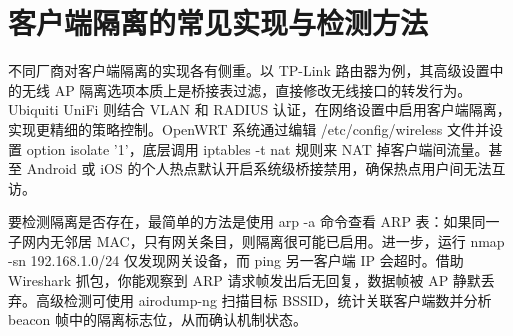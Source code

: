 \chapter{客户端隔离的常见实现与检测方法}
不同厂商对客户端隔离的实现各有侧重。以 TP-Link 路由器为例，其高级设置中的无线 AP 隔离选项本质上是桥接表过滤，直接修改无线接口的转发行为。Ubiquiti UniFi 则结合 VLAN 和 RADIUS 认证，在网络设置中启用客户端隔离，实现更精细的策略控制。OpenWRT 系统通过编辑 /etc/config/wireless 文件并设置 option isolate '1'，底层调用 iptables -t nat 规则来 NAT 掉客户端间流量。甚至 Android 或 iOS 的个人热点默认开启系统级桥接禁用，确保热点用户间无法互访。\par
要检测隔离是否存在，最简单的方法是使用 arp -a 命令查看 ARP 表：如果同一子网内无邻居 MAC，只有网关条目，则隔离很可能已启用。进一步，运行 nmap -sn 192.168.1.0/24 仅发现网关设备，而 ping 另一客户端 IP 会超时。借助 Wireshark 抓包，你能观察到 ARP 请求帧发出后无回复，数据帧被 AP 静默丢弃。高级检测可使用 airodump-ng 扫描目标 BSSID，统计关联客户端数并分析 beacon 帧中的隔离标志位，从而确认机制状态。\par
